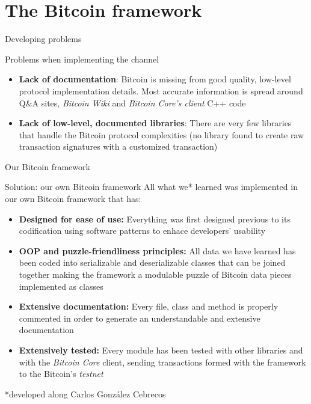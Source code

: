 \documentclass{beamer}
\begin{document}
\section{The Bitcoin framework}
\begin{frame}{Developing problems}
 \begin{alertblock}{Problems when implementing the channel}
  \begin{itemize}[<+->]
   \item \textbf{Lack of documentation}: Bitcoin is missing from good quality, low-level protocol implementation details. Most accurate information is spread around Q\&A sites, \textit{Bitcoin Wiki} and \textit{Bitcoin Core's client} C++ code
   \item \textbf{Lack of low-level, documented libraries}: There are very few libraries that handle the Bitcoin protocol complexities (no library found to create raw transaction signatures with a customized transaction)
  \end{itemize}
 \end{alertblock}
\end{frame}
\begin{frame}{Our Bitcoin framework}
 \begin{exampleblock}{Solution: our own Bitcoin framework}
  All what we* learned was implemented in our own Bitcoin framework that has:
  \begin{itemize}
   \item \textbf{Designed for ease of use:} Everything was first designed previous to its codification using software patterns to enhace developers' usability
   \item \textbf{OOP and puzzle-friendliness principles:} All data we have learned has been coded into serializable and deserializable classes that can be joined together making the framework a modulable puzzle of Bitcoin data pieces implemented as classes
   \item \textbf{Extensive documentation:} Every file, class and method is properly commented in order to generate an understandable and extensive documentation
   \item \textbf{Extensively tested:} Every module has been tested with other libraries and with the \textit{Bitcoin Core} client, sending transactions formed with the framework to the Bitcoin's \textit{testnet}
  \end{itemize}
  \pause
  \begin{center}
   *developed along Carlos González Cebrecos
  \end{center}
 \end{exampleblock}
\end{frame}
\end{document}

